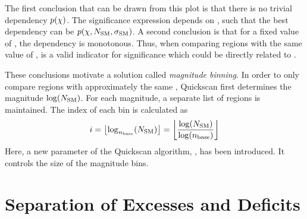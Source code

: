 The first conclusion that can be drawn from this plot is that there is no trivial dependency $p(\chi)$. The significance expression depends on \Nmc, such that the best dependency can be $p(\chi, {N_\mathrm{SM}}, {\sigma_\mathrm{SM}})$.
A second conclusion is that for a fixed value of \Nmc, the dependency is monotonous. Thus, when comparing regions with the same value of \Nmc, \mychi is a valid indicator for significance which could be directly related to \p.
 
These conclusions motivate a solution called \emph{magnitude binning}.
In order to only compare regions with approximately the same \Nmc, Quickscan first determines the magnitude $\log({N_\mathrm{SM}})$. For each magnitude, a separate list of \paramregions regions is maintained. 
The index of each bin is calculated as 
\[
i = \left\lfloor\log_{n_\mathrm{base}}({N_\mathrm{SM}})\right\rfloor = \left\lfloor\frac{\log({N_\mathrm{SM}})}{\log({n_\mathrm{base}})}\right\rfloor
\]
Here, a new parameter of the Quickscan algorithm, \parambinbase, has been introduced. It controls the size of the magnitude bins.

\section{Separation of Excesses and Deficits}






